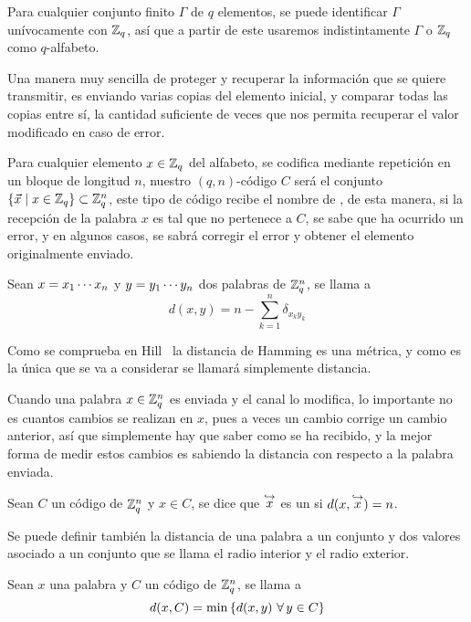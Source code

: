 Para cualquier conjunto finito $\Gamma$ de $q$ elementos, se puede identificar $\Gamma$ unívocamente con $\mathbb{Z}_q$, así que a partir de este usaremos indistintamente $\Gamma$ o $\mathbb{Z}_q$ como $q$-alfabeto.

Una manera muy sencilla de proteger y recuperar la información que se quiere transmitir, es enviando varias copias del elemento inicial, y comparar todas las copias entre sí, la cantidad suficiente de veces que nos permita recuperar el valor modificado en caso de error.

Para cualquier elemento $x\in\mathbb{Z}_q$ del alfabeto, se codifica mediante repetición en un bloque de longitud $n$, nuestro $(q, n)$-código $C$ será el conjunto $\left\{\vec{x}\mid x\in\mathbb{Z}_q\right\}\subset \mathbb{Z}_q^n$, este tipo de código recibe el nombre de , de esta manera, si la recepción de la palabra $x$ es tal que no pertenece a $C$, se sabe que ha ocurrido un error, y en algunos casos, se sabrá corregir el error y obtener el elemento originalmente enviado.

\begin{definition}
	Sean $x=x_1\cdots x_{n}$ y $y=y_1\cdots y_{n}$ dos palabras de $\mathbb{Z}_q^n$, se llama  a
	\[
		d(x, y) = n-\sum_{k=1}^n \delta_{x_k y_k}
	\]
\end{definition}

Como se comprueba en Hill~\cite{hill_first_1980} la distancia de Hamming es una métrica, y como es la única que se va a considerar se llamará simplemente distancia.

Cuando una palabra $x\in\mathbb{Z}_q^n$ es enviada y el canal lo modifica, lo importante no es cuantos cambios se realizan en $x$, pues a veces un cambio corrige un cambio anterior, así que simplemente hay que saber como se ha recibido, y la mejor forma de medir estos cambios es sabiendo la distancia con respecto a la palabra enviada.

\begin{definition}
	Sean $C$ un código de $\mathbb{Z}_q^n$ y $x\in C$, se dice que $\stackrel{\hookrightarrow}{x}$ es un  si $d(x, \stackrel{\hookrightarrow}{x})= n$.
\end{definition}

Se puede definir también la distancia de una palabra a un conjunto y dos valores asociado a un conjunto que se llama el radio interior y el radio exterior.

\begin{definition}
	Sean $x$ una palabra y $C$ un código de $\mathbb{Z}_q^n$, se llama  a
	\[
		d(x, C) = \min\set{d(x,y)\ \forall y\in C}
	\]
\end{definition}

